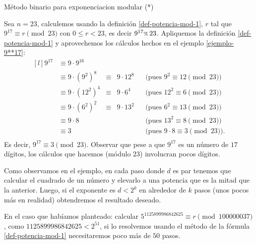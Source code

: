 \begin{section}{Método binario para exponenciacion modular (*)}
  \begin{ejemplo}
    Sea $n = 23$, calculemos usando  la definición \ref{def-potencia-mod-1}, $r$ tal que  $9^{17} \equiv r \pmod{23}$ con $0 \le r < 23$,  es decir $9^{17} {\scriptstyle \%}\, 23$. Apliquemos la definición \eqref{def-potencia-mod-1} y aprovechemos los cálculos hechos en el ejemplo \ref{ejemplo-9**17}:
    \begin{equation*}\label{eq-3**17-mod-21}
        \begin{matrix*}[l]
            9^{17}  &\equiv  9 \cdot 9^{16}& & &&\\
                    &\equiv  9 \cdot (9^{2})^8   &\equiv& 9 \cdot 12^8&&\text{(pues $9^2 \equiv 12 \pmod{23}$)} \\
                    &\equiv  9 \cdot (12^2)^4 &\equiv&  9 \cdot 6^4&&\text{(pues $12^2 \equiv 6\pmod{23}$)}  \\
                    &\equiv  9 \cdot (6^2)^2 &\equiv&  9 \cdot 13^2&&\text{(pues $6^2 \equiv 13 \pmod{23}$)}\\
                    &\equiv  9 \cdot 8 &&  &&\text{(pues $13^2 \equiv 8\pmod{23}$)}\\
                    &\equiv 3 &&  &&\text{(pues $9\cdot 8 \equiv 3 \pmod{23}$).}\\
        \end{matrix*}
    \end{equation*}
    Es decir, $9^{17} \equiv 3 \pmod{23}$. Observar que pese a que $9^{17}$ es un número de $17$ dígitos, los cálculos que hacemos (módulo $23$) involucran pocos dígitos.   

  \end{ejemplo}

Como observamos en el ejemplo,  en cada paso donde $d$ es par tenemos que calcular el cuadrado de un número y elevarlo a una potencia que es la mitad  que la anterior. Luego,  si  el exponente es $d < 2^k$ en alrededor de $k$ pasos (unos pocos más en realidad) obtendremos el resultado deseado. 

En  el caso  que habíamos planteado: calcular $ 5^{1125899986842625} \equiv r \pmod{100000037}$, como $1125899986842625 < 2^{51}$, si lo resolvemos usando el método de la fórmula \eqref{def-potencia-mod-1} necesitaremos poco más de $50$ pasos. 



\end{section}
